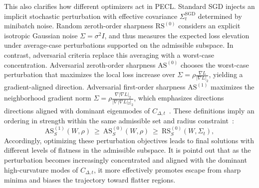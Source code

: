 \documentclass{article}
\theoremstyle{plain}
\theoremstyle{definition}
\theoremstyle{remark}
\begin{document}
This also clarifies how different optimizers act in PECL. Standard SGD injects an implicit stochastic perturbation with effective covariance $\Sigma_t^{\mathrm{SGD}}$ determined by minibatch noise\cite{pmlr-v97-zhu19e}. Random zeroth-order sharpness $\mathrm{RS}^{(0)}$ considers an explicit isotropic Gaussian noise $\Sigma=\sigma^2 I$, and thus measures the expected loss elevation under average-case perturbations supported on the admissible subspace. In contrast, adversarial criteria replace this averaging with a worst-case concentration. Adversarial zeroth-order sharpness $\mathrm{AS}^{(0)}$ chooses the worst-case perturbation that maximizes the local loss increase over $\Sigma=\rho\frac{\nabla L}{|\nabla L|_2}$, yielding a gradient-aligned direction\cite{foretSharpnessAwareMinimizationEfficiently2021}. Adversarial first-order sharpness $\mathrm{AS}^{(1)}$ maximizes the neighborhood gradient norm
$\Sigma=\rho\frac{\nabla|\nabla L|_2}{|\nabla|\nabla L|_2|_2}$,
which emphasizes directions directions aligned with dominant eigenmodes of $C_{\Delta,t}$~\cite{zhangGradientNormAware2023}. These definitions imply an ordering in strength within the same admissible set and radius constraint~\cite{mollenhoffSAMOptimalRelaxation2022,Zhang_GAM}:
$$
\mathrm{AS}^{(1)}_S(W,\rho)\ \ge\ \mathrm{AS}^{(0)}_S(W,\rho)\ \ge\ \mathrm{RS}^{(0)}_S(W,\Sigma_t),
$$
Accordingly, optimizing these perturbation objectives leads to final solutions with different levels of flatness in the admissible subspace. It is pointd out that as the perturbation becomes increasingly concentrated and aligned with the dominant high-curvature modes of $C_{\Delta,t}$, it more effectively promotes escape from sharp minima and biases the trajectory toward flatter regions. \cite{pmlr-v97-zhu19e,chen2026sharpnessflatnessdecompositionframework}
\end{document}
